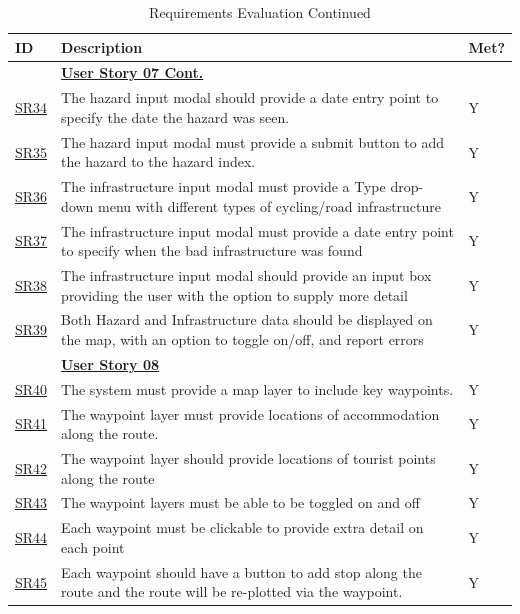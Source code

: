 \begin{table}[!htb]
    \ContinuedFloat
    \caption{Requirements Evaluation Continued}
    \label{evaluatedrqextended2}
    \small
    \begin{tabularx}{\textwidth}{ p{1cm} p{11cm} p{1cm} }
        \hline
        ID & Description & Met? \\ 
        \hline
        & \textbf{\hyperref[tab:user-story-07]{User Story 07 Cont.}}  \\
        \hyperref[SR:34]{SR34} & The hazard input modal should provide a date entry point to specify the date the hazard was seen. & Y\\
        \hyperref[SR:35]{SR35} & The hazard input modal must provide a submit button to add the hazard to the hazard index. & Y\\
        \hyperref[SR:36]{SR36} & The infrastructure input modal must provide a Type drop-down menu with different types of cycling/road infrastructure & Y\\
        \hyperref[SR:37]{SR37} & The infrastructure input modal must provide a date entry point to specify when the bad infrastructure was found & Y\\
        \hyperref[SR:38]{SR38} & The infrastructure input modal should provide an input box providing the user with the option to supply more detail & Y\\
        \hyperref[SR:39]{SR39} & Both Hazard and Infrastructure data should be displayed on the map, with an option to toggle on/off, and report errors & Y\\
        \hline
        & \textbf{\hyperref[tab:user-story-08]{User Story 08}}  \\
        \hyperref[SR:40]{SR40} & The system must provide a map layer to include key waypoints. & Y \\
        \hyperref[SR:41]{SR41} & The waypoint layer must provide locations of accommodation along the route. & Y\\
        \hyperref[SR:42]{SR42} & The waypoint layer should provide locations of tourist points along the route & Y\\
        \hyperref[SR:43]{SR43} & The waypoint layers must be able to be toggled on and off & Y\\
        \hyperref[SR:44]{SR44} & Each waypoint must be clickable to provide extra detail on each point & Y\\
        \hyperref[SR:45]{SR45} & Each waypoint should have a button to add stop along the route and the route will be re-plotted via the waypoint. & Y\\

\end{tabularx}
\end{table}
